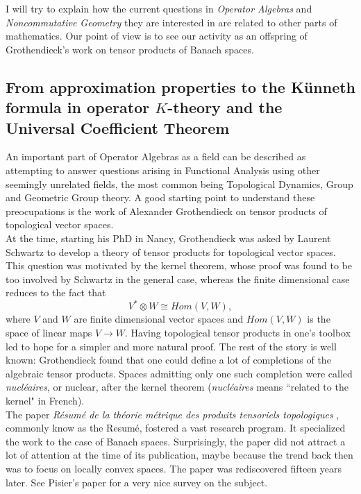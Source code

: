 I will try to explain how the current questions in \textit{Operator Algebras} and \textit{Noncommutative Geometry} they are interested in are related to other parts of mathematics. Our point of view is to see our activity as an offspring of Grothendieck's work on tensor products of Banach spaces.    

\subsection{From approximation properties to the K\"unneth formula in operator $K$-theory and the Universal Coefficient Theorem}

An important part of Operator Algebras as a field can be described as attempting to answer questions arising in Functional Analysis using other seemingly unrelated fields, the most common being Topological Dynamics, Group and Geometric Group theory. A good starting point to understand these preocupations is the work of Alexander Grothendieck on tensor products of topological vector spaces. \\

At the time, starting his PhD in Nancy, Grothendieck was asked by Laurent Schwartz to develop a theory of tensor products for topological vector spaces. This question was motivated by the kernel theorem, whose proof was found to be too involved by Schwartz in the general case, whereas the finite dimensional case reduces to the fact that 
\[V^*\otimes W \cong Hom(V,W),\] 
where $V$ and $W$ are finite dimensional vector spaces and $Hom(V,W)$ is the space of linear maps $V\rightarrow W$. Having topological tensor products in one's toolbox led to hope for a simpler and more natural proof. The rest of the story is well known: Grothendieck found that one could define a lot of completions of the algebraic tensor products. Spaces admitting only one such completion were called \textit{nucl\'eaires}, or nuclear, after the kernel theorem (\textit{nucl\'eaires} means ``related to the kernel" in French).\\

The paper \textit{R\'esum\'e de la th\'eorie m\'etrique des produits tensoriels topologiques} \cite{GrothendieckResume}, commonly know as the Resum\'e, fostered a vast research program. It specialized the work to the case of Banach spaces. Surprisingly, the paper did not attract a lot of attention at the time of its publication, maybe because the trend back then was to focus on locally convex spaces. The paper was rediscovered fifteen years later. See Pisier's paper \cite{PisierSurvey} for a very nice survey on the subject.\\

